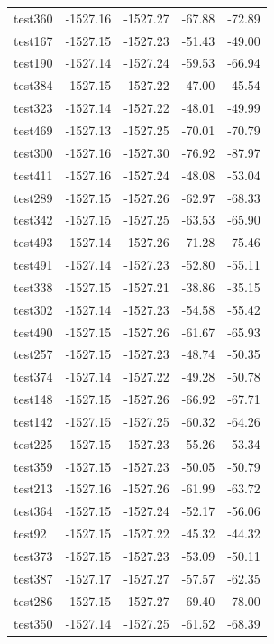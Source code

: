 \documentclass[journal=jacsat,manuscript=article]{achemso}
\begin{document}
\begin{table}[b!]
\begin{tabular}{lrrrr}
test360 &  -1527.16 &  -1527.27 &  -67.88 &  -72.89 \\
test167 &  -1527.15 &  -1527.23 &  -51.43 &  -49.00 \\
test190 &  -1527.14 &  -1527.24 &  -59.53 &  -66.94 \\
test384 &  -1527.15 &  -1527.22 &  -47.00 &  -45.54 \\
test323 &  -1527.14 &  -1527.22 &  -48.01 &  -49.99 \\
test469 &  -1527.13 &  -1527.25 &  -70.01 &  -70.79 \\
test300 &  -1527.16 &  -1527.30 &  -76.92 &  -87.97 \\
test411 &  -1527.16 &  -1527.24 &  -48.08 &  -53.04 \\
test289 &  -1527.15 &  -1527.26 &  -62.97 &  -68.33 \\
test342 &  -1527.15 &  -1527.25 &  -63.53 &  -65.90 \\
test493 &  -1527.14 &  -1527.26 &  -71.28 &  -75.46 \\
test491 &  -1527.14 &  -1527.23 &  -52.80 &  -55.11 \\
test338 &  -1527.15 &  -1527.21 &  -38.86 &  -35.15 \\
test302 &  -1527.14 &  -1527.23 &  -54.58 &  -55.42 \\
test490 &  -1527.15 &  -1527.26 &  -61.67 &  -65.93 \\
test257 &  -1527.15 &  -1527.23 &  -48.74 &  -50.35 \\
test374 &  -1527.14 &  -1527.22 &  -49.28 &  -50.78 \\
test148 &  -1527.15 &  -1527.26 &  -66.92 &  -67.71 \\
test142 &  -1527.15 &  -1527.25 &  -60.32 &  -64.26 \\
test225 &  -1527.15 &  -1527.23 &  -55.26 &  -53.34 \\
test359 &  -1527.15 &  -1527.23 &  -50.05 &  -50.79 \\
test213 &  -1527.16 &  -1527.26 &  -61.99 &  -63.72 \\
test364 &  -1527.15 &  -1527.24 &  -52.17 &  -56.06 \\
test92  &  -1527.15 &  -1527.22 &  -45.32 &  -44.32 \\
test373 &  -1527.15 &  -1527.23 &  -53.09 &  -50.11 \\
test387 &  -1527.17 &  -1527.27 &  -57.57 &  -62.35 \\
test286 &  -1527.15 &  -1527.27 &  -69.40 &  -78.00 \\
test350 &  -1527.14 &  -1527.25 &  -61.52 &  -68.39 \\

\end{tabular}
\end{table}
\end{document}
